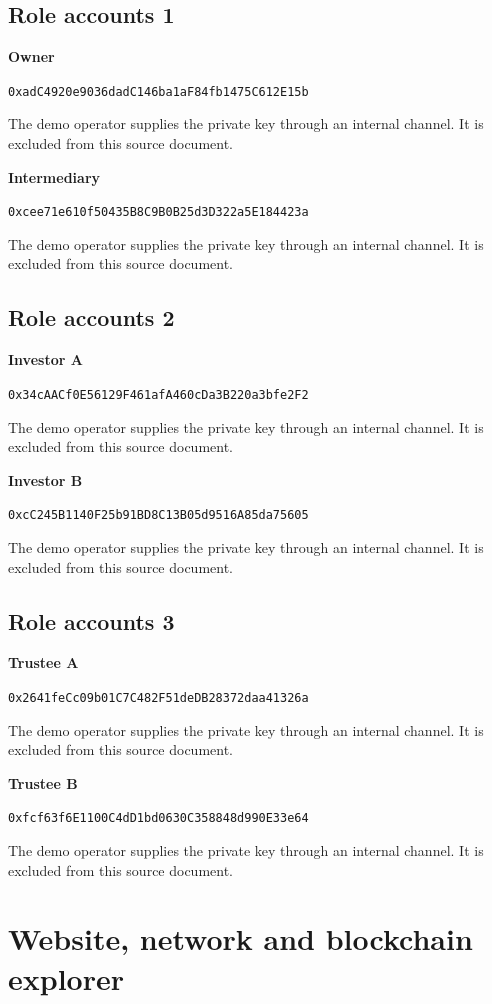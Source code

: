 \documentclass[12pt,a4paper]{article}
\begin{document}
\clearpage\begin{landscape}
\subsection{Role accounts 1}
\textbf{Owner}\par
\nolinkurl{0xadC4920e9036dadC146ba1aF84fb1475C612E15b}\par
The demo operator supplies the private key through an internal channel. It is excluded from this source document.

\textbf{Intermediary}\par
\nolinkurl{0xcee71e610f50435B8C9B0B25d3D322a5E184423a}\par
The demo operator supplies the private key through an internal channel. It is excluded from this source document.

\end{landscape}
\clearpage\begin{landscape}
\subsection{Role accounts 2}
\textbf{Investor A}\par
\nolinkurl{0x34cAACf0E56129F461afA460cDa3B220a3bfe2F2}\par
The demo operator supplies the private key through an internal channel. It is excluded from this source document.

\textbf{Investor B}\par
\nolinkurl{0xcC245B1140F25b91BD8C13B05d9516A85da75605}\par
The demo operator supplies the private key through an internal channel. It is excluded from this source document.

\end{landscape}
\clearpage\begin{landscape}
\subsection{Role accounts 3}
\textbf{Trustee A}\par
\nolinkurl{0x2641feCc09b01C7C482F51deDB28372daa41326a}\par
The demo operator supplies the private key through an internal channel. It is excluded from this source document.

\textbf{Trustee B}\par
\nolinkurl{0xfcf63f6E1100C4dD1bd0630C358848d990E33e64}\par
The demo operator supplies the private key through an internal channel. It is excluded from this source document.

\end{landscape}
\clearpage\section{Website, network and blockchain explorer}
\end{document}
